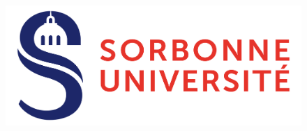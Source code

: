 \begin{titlepage}

\begin{figure}[H]
    \centering
    \includegraphics[scale=0.1]{Logo.png}

    \label{fig:enter-label}
\end{figure}

\begin{center}



\end{center}
\end{titlepage}
